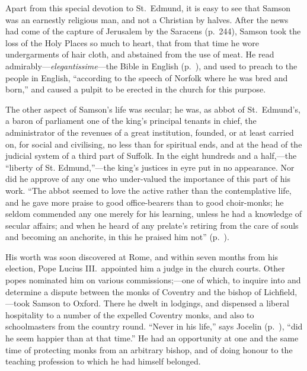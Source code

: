 \documentclass[10pt]{book}
\begin{document}
{Apart from this special devotion to St.\ Edmund, it is easy to see that Samson was an earnestly religious man, and not a Christian by halves. After the news had come of the capture of Jerusalem by the Saracens (p.\ 244), Samson took the loss of the Holy Places so much to heart, that from that time he wore undergarments of hair cloth, and abstained from the use of meat. He read admirably---\emph{elegantissime}---the Bible in English (p.\ ), and used to preach to the people in English, ``according to the speech of Norfolk where he was bred and born,'' and caused a pulpit to be erected in the church for this purpose.

The other aspect of Samson's life was secular; he was, as abbot of St.\ Edmund's, a baron of parliament one of the king's principal tenants in chief, the administrator of the revenues of a great institution, founded, or at least carried on, for social and civilising, no less than for spiritual ends, and at the head of the judicial system of a third part of Suffolk. In the eight hundreds and a half,---the ``liberty of St. Edmund,''---the king's justices in eyre put in no appearance. Nor did he approve of any one who under-valued the importance of this part of his work. ``The abbot seemed to love the active rather than the contemplative life, and he gave more praise to good office-bearers than to good choir-monks; he seldom commended any one merely for his learning, unless he had a knowledge of secular affairs; and when he heard of any prelate's retiring from the care of souls and becoming an anchorite, in this he praised him not'' (p.\ ).

His worth was soon discovered at Rome, and within seven months from his election, Pope Lucius III.\ appointed him a judge in the church courts. Other popes nominated him on various commissions;---one of which, to inquire into and determine a dispute between the monks of Coventry and the bishop of Lichfield,---took Samson to Oxford. There he dwelt in lodgings, and dispensed a liberal hospitality to a number of the expelled Coventry monks, and also to schoolmasters from the country round. ``Never in his life,'' says Jocelin (p.\ ), ``did he seem happier than at that time.'' He had an opportunity at one and the same time of protecting monks from an arbitrary bishop, and of doing honour to the teaching profession to which he had himself belonged.

}
\end{document}
